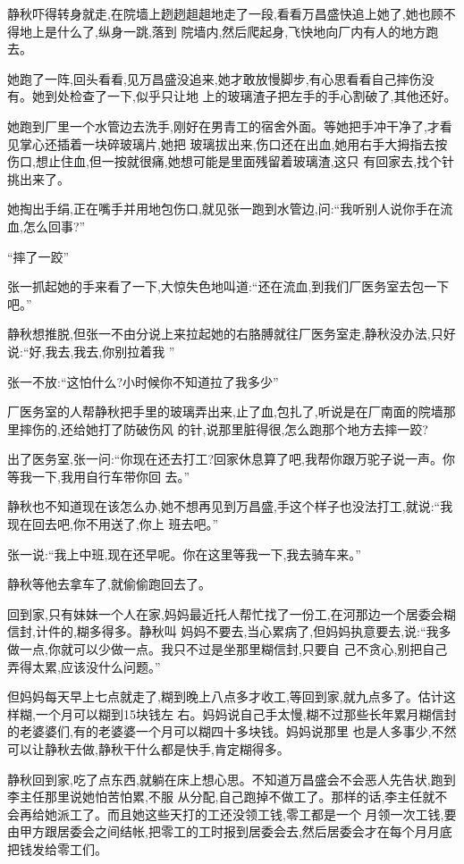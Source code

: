 ﻿\documentclass[12pt]{article}
\begin{document}
静秋吓得转身就走,在院墙上趔趔趄趄地走了一段,看看万昌盛快追上她了,她也顾不得地上是什么了,纵身一跳,落到
院墙内,然后爬起身,飞快地向厂内有人的地方跑去。

她跑了一阵,回头看看,见万昌盛没追来,她才敢放慢脚步,有心思看看自己摔伤没有。她到处检查了一下,似乎只让地
上的玻璃渣子把左手的手心割破了,其他还好。

她跑到厂里一个水管边去洗手,刚好在男青工的宿舍外面。等她把手冲干净了,才看见掌心还插着一块碎玻璃片,她把
玻璃拔出来,伤口还在出血,她用右手大拇指去按伤口,想止住血,但一按就很痛,她想可能是里面残留着玻璃渣,这只
有回家去,找个针挑出来了。

她掏出手绢,正在嘴手并用地包伤口,就见张一跑到水管边,问:``我听别人说你手在流血,怎么回事?''

``摔了一跤\myrule ''

张一抓起她的手来看了一下,大惊失色地叫道:``还在流血,到我们厂医务室去包一下吧。''

静秋想推脱,但张一不由分说上来拉起她的右胳膊就往厂医务室走,静秋没办法,只好说:``好,我去,我去,你别拉着我
\myrule ''

张一不放:``这怕什么?小时候你不知道拉了我多少\myrule ''


厂医务室的人帮静秋把手里的玻璃弄出来,止了血,包扎了,听说是在厂南面的院墙那里摔伤的,还给她打了防破伤风
的针,说那里脏得很,怎么跑那个地方去摔一跤?

出了医务室,张一问:``你现在还去打工?回家休息算了吧,我帮你跟万驼子说一声。你等我一下,我用自行车带你回
去。''

静秋也不知道现在该怎么办,她不想再见到万昌盛,手这个样子也没法打工,就说:``我现在回去吧,你不用送了,你上
班去吧。''

张一说:``我上中班,现在还早呢。你在这里等我一下,我去骑车来。''

静秋等他去拿车了,就偷偷跑回去了。

回到家,只有妹妹一个人在家,妈妈最近托人帮忙找了一份工,在河那边一个居委会糊信封,计件的,糊多得多。静秋叫
妈妈不要去,当心累病了,但妈妈执意要去,说:``我多做一点,你就可以少做一点。我只不过是坐那里糊信封,只要自
己不贪心,别把自己弄得太累,应该没什么问题。''

但妈妈每天早上七点就走了,糊到晚上八点多才收工,等回到家,就九点多了。估计这样糊,一个月可以糊到15块钱左
右。妈妈说自己手太慢,糊不过那些长年累月糊信封的老婆婆们,有的老婆婆一个月可以糊四十多块钱。妈妈说那里
也是人多事少,不然可以让静秋去做,静秋干什么都是快手,肯定糊得多。

静秋回到家,吃了点东西,就躺在床上想心思。不知道万昌盛会不会恶人先告状,跑到李主任那里说她怕苦怕累,不服
从分配,自己跑掉不做工了。那样的话,李主任就不会再给她派工了。而且她这些天打的工还没领工钱,零工都是一个
月领一次工钱,要由甲方跟居委会之间结帐,把零工的工时报到居委会去,然后居委会才在每个月月底把钱发给零工们。
\end{document}
